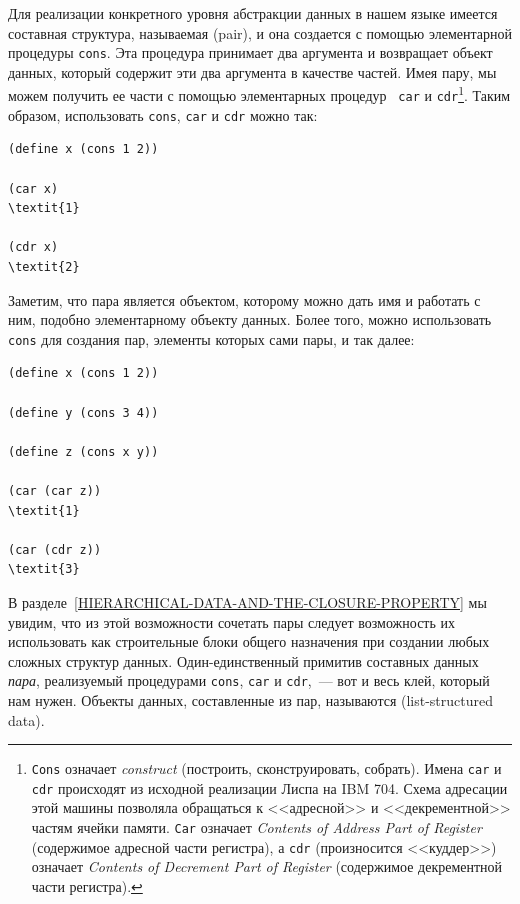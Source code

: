 Для реализации конкретного уровня 
абстракции данных в нашем языке имеется составная структура, называемая
 (pair), и она создается с помощью
элементарной процедуры {\tt cons}. Эта
процедура принимает два аргумента и возвращает объект данных, который
содержит эти два аргумента в качестве частей.  Имея пару, мы можем
получить ее части с помощью элементарных процедур {\tt
  car}
 и {\tt cdr}\footnote{{\tt Cons} означает
  {\em construct}
(построить, сконструировать, собрать).  Имена {\tt car} и {\tt cdr}
происходят из исходной
реализации Лиспа на IBM 704.  Схема адресации
этой машины позволяла обращаться к <<адресной>> и
<<декрементной>> частям ячейки памяти. {\tt Car}
означает 
{\em Contents of Address Part of Register} (содержимое адресной 
части регистра), а {\tt cdr} (произносится <<куддер>>)
означает
{\em Contents of Decrement Part of Register} (содержимое
декрементной части регистра).}.
Таким образом, использовать {\tt cons},
{\tt car} и {\tt cdr} можно так:

\begin{Verbatim}[fontsize=\small]
(define x (cons 1 2))

(car x)
\textit{1}

(cdr x)
\textit{2}
\end{Verbatim}
Заметим, что пара является объектом, которому можно дать имя и 
работать с ним, подобно элементарному объекту данных.  Более того, можно
использовать {\tt cons} для создания пар, элементы которых сами
пары, и так далее:

\begin{Verbatim}[fontsize=\small]
(define x (cons 1 2))

(define y (cons 3 4))

(define z (cons x y))

(car (car z))
\textit{1}

(car (cdr z))
\textit{3}
\end{Verbatim}
В разделе~\ref{HIERARCHICAL-DATA-AND-THE-CLOSURE-PROPERTY}
мы увидим, что из этой возможности сочетать пары следует возможность
их использовать как строительные блоки общего назначения при создании
любых сложных структур данных.  Один-единственный примитив составных
данных {\em пара}, реализуемый процедурами {\tt cons},
{\tt car} и {\tt cdr},~--- вот и весь клей, который нам
нужен.  Объекты данных, составленные из пар, называются 
(list-structured data).

